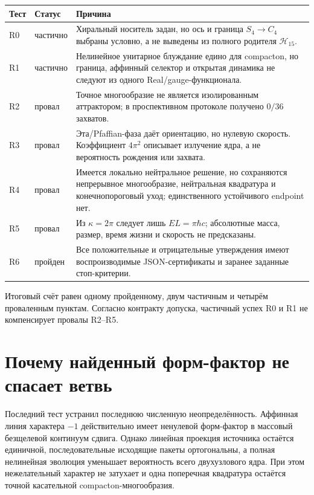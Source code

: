 \begin{center}
\begin{tabular}{>{\raggedright\arraybackslash}p{}
                  >{\raggedright\arraybackslash}p{}
                  >{\raggedright\arraybackslash}p{}}
\toprule
Тест & Статус & Причина \\
\midrule
R0 & частично & Хиральный носитель задан, но ось и граница
$S_4\to C_4$ выбраны условно, а не выведены из полного родителя
$\mathcal H_{15}$. \\
R1 & частично & Нелинейное унитарное блуждание едино для compacton,
но граница, аффинный селектор и открытая динамика не следуют из одного
Real/gauge-функционала. \\
R2 & провал & Точное многообразие не является изолированным аттрактором;
в проспективном протоколе получено $0/36$ захватов. \\
R3 & провал & Эта/Pfaffian-фаза даёт ориентацию, но нулевую скорость.
Коэффициент $4\pi^2$ описывает излучение ядра, а не вероятность рождения
или захвата. \\
R4 & провал & Имеется локально нейтральное решение, но сохраняются
непрерывное многообразие, нейтральная квадратура и конечнопороговый уход;
единственного устойчивого endpoint нет. \\
R5 & провал & Из $\kappa=2\pi$ следует лишь
$EL=\pi\hbar c$; абсолютные масса, размер, время жизни и скорость не
предсказаны. \\
R6 & пройден & Все положительные и отрицательные утверждения имеют
воспроизводимые JSON-сертификаты и заранее заданные стоп-критерии. \\
\bottomrule
\end{tabular}
\end{center}

Итоговый счёт равен одному пройденному, двум частичным и четырём
проваленным пунктам. Согласно контракту допуска, частичный успех R0 и R1
не компенсирует провалы R2--R5.

\section{Почему найденный форм-фактор не спасает ветвь}

Последний тест устранил последнюю численную неопределённость. Аффинная
линия характера $-1$ действительно имеет ненулевой форм-фактор в
массовый безщелевой континуум сдвига. Однако линейная проекция источника
остаётся единичной, последовательные исходящие пакеты ортогональны, а
полная нелинейная эволюция уменьшает вероятность всего двухузлового ядра.
При этом нежелательный характер не затухает и одна поперечная квадратура
остаётся точной касательной compacton-многообразия.

